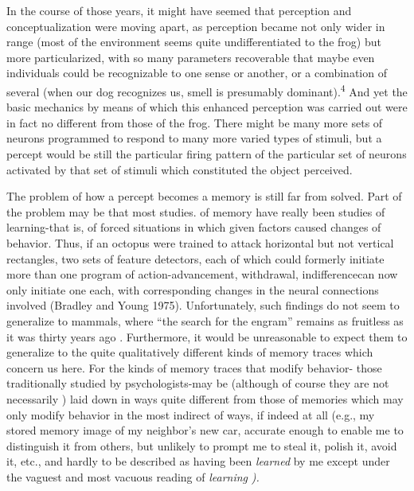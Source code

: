 In the course of those years, it might have seemed that per\-ception and conceptualization were moving apart, as perception became not only wider in range (most of the environment seems quite un\-differentiated to the frog) but more particularized, with so many parameters recoverable that maybe even individuals could be recogniz\-able to one sense or another, or a combination of several (when our dog recognizes us, smell is presumably dominant).\textsuperscript{4} And yet the basic mechanics by means of which this enhanced perception was carried out were in fact no different from those of the frog. There might be many more sets of neurons programmed to respond to many more varied types of stimuli, but a percept would be still the particular
firing pattern of the particular set of neurons activated by that set of
stimuli which constituted the object perceived.

The problem of how a percept becomes a memory is still far from solved. Part of the problem may be that most studies. of memory have really been studies of learning-that is, of forced situations in which given factors caused changes of behavior. Thus, if an octopus were trained to attack horizontal but not vertical rectangles, two sets of feature detectors, each of which could formerly initiate more than one program of action-advancement, withdrawal, indifference\-can now only initiate one each, with corresponding changes in the neural connections involved (Bradley and Young 1975). Unfortunately, such findings do not seem to generalize to mammals, where ``the search for the engram'' remains as fruitless as it was thirty years ago \citep{Lashley1950}. Furthermore, it would be unreasonable to expect them to generalize to the quite qualitatively different kinds of memory traces which concern us here. For the kinds of memory traces that modify behavior- those traditionally studied by psychologists-may be (although of course they are not necessarily ) laid down in ways quite different from those of memories which may only modify beha\-vior in the most indirect of ways, if indeed at all (e.g., my stored memory image of my neighbor's new car, accurate enough to enable me to distinguish it from others, but unlikely to prompt me to steal it, polish it, avoid it, etc., and hardly to be described as having been \textit{learned} by me except under the vaguest and most vacuous reading of \textit{learning} \textit{).}

